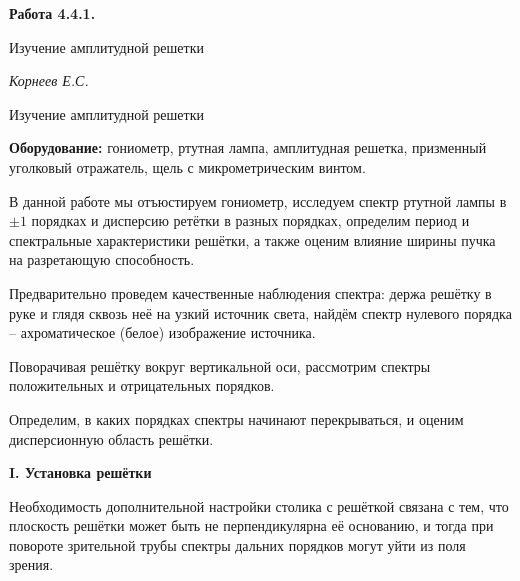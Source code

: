 \documentclass[14pt]{article}
\begin{document}
\begin{titlepage}
	\begin{center}
		\fontsize{18pt}{20pt}\selectfont
		\textbf{Работа 4.4.1.}	
	
		\vspace{5cm}
		\fontsize{24pt}{25pt}\selectfont
		Изучение амплитудной решетки
	\end{center}
	\begin{flushright}
		\fontsize{18pt}{20pt}\selectfont
		\vspace{14cm}
		\hspace{-3cm}
		\textit{Корнеев Е.С.}
	\end{flushright}		
\end{titlepage}

\begin{center}
	\fontsize{16pt}{18pt}\selectfont
	Изучение амплитудной решетки
\end{center}


\fontsize{14pt}{16pt}\selectfont

\vspace{0.5cm}
\textbf{Оборудование:} гониометр, ртутная лампа, амплитудная решетка, призменный уголковый отражатель, щель с микрометрическим винтом.

\vspace{1cm}

В данной работе мы отъюстируем гониометр, исследуем спектр ртутной лампы в $\pm 1$ порядках и дисперсию ретётки в разных порядках, определим период и спектральные характеристики решётки, а также оценим влияние ширины пучка на разретающую способность.

Предварительно проведем качественные наблюдения спектра: держа решётку в руке и глядя сквозь неё на узкий источник света, найдём спектр нулевого порядка -- ахроматическое (белое) изображение источника.

Поворачивая решётку вокруг вертикальной оси, рассмотрим спектры положительных и отрицательных порядков.

Определим, в каких порядках спектры начинают перекрываться, и оценим дисперсионную область решётки.

\vspace{1cm}
\textbf{I. Установка решётки}

Необходимость дополнительной настройки столика с решёткой связана с тем, что плоскость решётки может быть не перпендикулярна её основанию, и тогда при повороте зрительной трубы спектры дальних порядков могут уйти из поля зрения.
\end{document}
